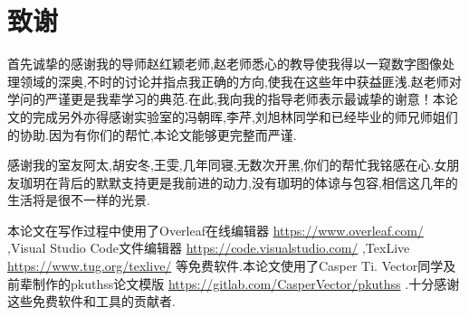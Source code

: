 \chapter{致谢}
首先诚挚的感谢我的导师赵红颖老师,赵老师悉心的教导使我得以一窥数字图像处理领域的深奥,不时的讨论并指点我正确的方向,使我在这些年中获益匪浅.赵老师对学问的严谨更是我辈学习的典范.在此,我向我的指导老师表示最诚挚的谢意！本论文的完成另外亦得感谢实验室的冯朝晖,李芹,刘旭林同学和已经毕业的师兄师姐们的协助.因为有你们的帮忙,本论文能够更完整而严谨.
\par
感谢我的室友阿太,胡安冬,王雯,几年同寝,无数次开黑,你们的帮忙我铭感在心.女朋友珈玥在背后的默默支持更是我前进的动力,没有珈玥的体谅与包容,相信这几年的生活将是很不一样的光景.
\par
本论文在写作过程中使用了Overleaf在线编辑器 \url{https://www.overleaf.com/} ,Visual Studio Code文件编辑器 \url{https://code.visualstudio.com/} ,TexLive \url{https://www.tug.org/texlive/} 等免费软件.本论文使用了Casper Ti. Vector同学及前辈制作的pkuthss论文模版 \url{https://gitlab.com/CasperVector/pkuthss} .十分感谢这些免费软件和工具的贡献者.

